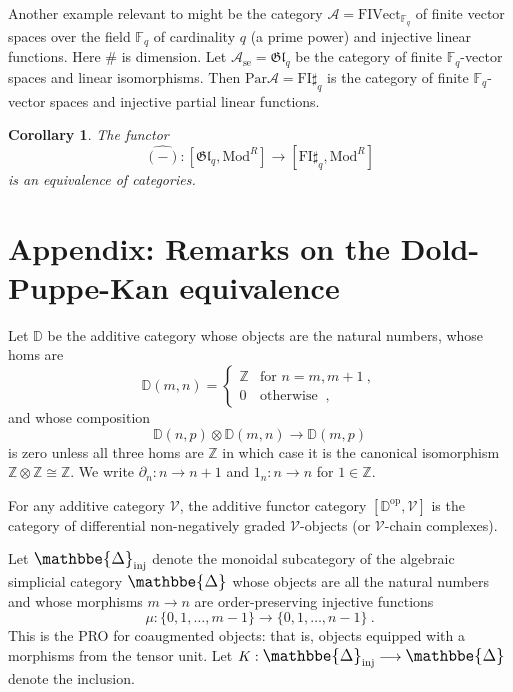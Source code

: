 \documentclass[a4paper,12pt,reqno]{amsart}
\def\makebigger#1#2#3{\hbox{#1$\mathsurround=0pt #2{#3}$}}
\def\bigger#1#2{{\relax\mathpalette{\makebigger#1}{#2}}}
\newcommand{\DelCat}{{\bigger\large{\mathbbe{\Delta}}}}
\newtheorem{corollary}[theorem]{Corollary}
\theoremstyle{definition}
\theoremstyle{fact}
\theoremstyle{genquest}
\theoremstyle{step}
\newcommand{\lra}{\longrightarrow}
\def\CA{{\mathscr A}}
\def\CV{{\mathscr V}}
\begin{document}
Another example relevant to \cite{repfgl} might be the category $\CA = \mathrm{FIVect}_{\mathbb{F}_q}$
of finite vector spaces over the field $\mathbb{F}_q$ of cardinality 
$q$ (a prime power) and injective linear functions.
Here $\#$ is dimension.
Let $\CA_{\mathrm{se}} = \mathfrak{Gl}_q$ be the category of finite
$\mathbb{F}_q$-vector spaces and linear isomorphisms. 
Then $\mathrm{Par}\CA = \mathrm{FI}\sharp_q$ is the
category of finite $\mathbb{F}_q$-vector spaces and injective 
partial linear functions.

\begin{corollary} The functor
$$\widehat{(-)} : [\mathfrak{Gl}_q, \mathrm{Mod}^R] \lra [\mathrm{FI}\sharp_q, \mathrm{Mod}^R]$$
is an equivalence of categories.
\end{corollary}   

\section{Appendix: Remarks on the Dold-Puppe-Kan equivalence}\label{DPK}

Let $\mathbb{D}$ be the additive category whose objects are the natural numbers,
whose homs are
\begin{equation*}
\mathbb{D}(m,n) =
\begin{cases}
\mathbb{Z} & \text{for } n=m,m+1 \ , \\
0 & \text{otherwise } \ ,
\end{cases}
\end{equation*}
and whose composition
$$\mathbb{D}(n,p)\otimes \mathbb{D}(m,n)\lra \mathbb{D}(m,p)$$
is zero unless all three homs are $\mathbb{Z}$ in which case it
is the canonical isomorphism $\mathbb{Z}\otimes \mathbb{Z}\cong \mathbb{Z}$.
We write $\partial_n : n\lra n+1$ and $1_n : n\lra n$ for $1\in \mathbb{Z}$.

For any additive category $\CV$, the additive functor category 
$[\mathbb{D}^{\mathrm{op}},\CV]$
is the category of differential non-negatively graded $\CV$-objects
(or $\CV$-chain complexes).

Let $\DelCat_{\mathrm{inj}}$ denote the monoidal subcategory of the algebraic simplicial category $\DelCat$ whose objects are all the natural numbers and whose morphisms $m\lra n$ are order-preserving injective functions 
$$\mu : \{0, 1, \dots , m-1\}\lra \{0, 1, \dots , n-1\} \ .$$
This is the PRO for coaugmented objects: that is, objects equipped with
a morphisms from the tensor unit. Let $K:\DelCat_{\mathrm{inj}}\lra \DelCat$ 
denote the inclusion.
\end{document}
